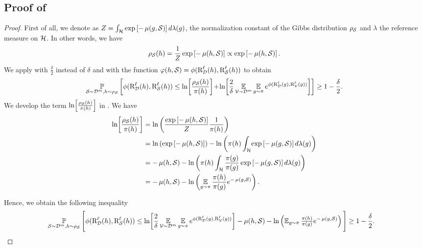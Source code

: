 \documentclass[twoside]{article}
\theoremstyle{plain}
\begin{document}
\subsection[Proof of Theorem 3]{Proof of }
\label{sec:proof-disintegrated-comp}
\theoremboundcomplexitymeasure*
\begin{proof}
First of all, we denote as $Z=\int_{\mathcal{H}}\exp\left[-\operatorname{\mu}(g, \mathcal{S})\right]d\lambda(g)$, the normalization constant of the Gibbs distribution $\rho_{\mathcal{S}}$ and $\lambda$ the reference measure on $\mathcal{H}$. 
In other words, we have
\begin{align*}
    \rho_{\mathcal{S}}(h) = \frac{1}{Z}\exp\left[-\operatorname{\mu}(h, \mathcal{S})\right] \propto \exp\left[-\operatorname{\mu}(h, \mathcal{S})\right].
\end{align*}
We apply  with $\frac{\delta}{2}$ instead of $\delta$ and with the function $\varphi(h,\mathcal{S})=\phi(\text{R}^{\ell}_{\mathcal{D}}(h), \text{R}^{\ell}_{\mathcal{S}}(h))$ to obtain
\begin{align*}
    \operatorname*{\mathbb{P}}_{\mathcal{S}\sim\mathcal{D}^m, h\sim\rho_{\mathcal{S}}}\left[\phi(\text{R}^{\ell}_{\mathcal{D}}(h), \text{R}^{\ell}_{\mathcal{S}}(h)) \le \ln\!\left[\frac{\rho_{\mathcal{S}}(h)}{\pi(h)}\right]\!+\!\ln\!\left[\frac{2}{\delta}\operatorname*{\mathbb{E}}_{\mathcal{V}\sim\mathcal{D}^m}\operatorname*{\mathbb{E}}_{g\sim\pi}e^{\phi(\text{R}^{\ell}_{\mathcal{D}}(g), \text{R}^{\ell}_{\mathcal{V}}(g))}\right] \right] \ge 1-\frac{\delta}{2}.
\end{align*}
We develop the term $\ln\!\left[\frac{\rho_{\mathcal{S}}(h)}{\pi(h)}\right]$ in . 
We have 
\begin{align*} 
    \ln\!\left[\frac{\rho_{\mathcal{S}}(h)}{\pi(h)}\right] &=  \ln\left( \frac{\exp\left[-\operatorname{\mu}(h, \mathcal{S})\right]}{Z}\frac{1}{\pi(h)}\right)\\
    &= \ln\left( \exp\left[-\operatorname{\mu}(h, \mathcal{S})\right]\right)-\ln\left(\pi(h)\int_{\mathcal{H}}\!\exp\left[-\operatorname{\mu}(g, \mathcal{S})\right] d\lambda(g)\right)\\
    &= -\operatorname{\mu}(h, \mathcal{S})-\ln\left(\pi(h)\int_{\mathcal{H}}\frac{\pi(g)}{\pi(g)}  \exp\left[-\operatorname{\mu}(g, \mathcal{S})\right]d\lambda(g) \right)\\
    &= -\operatorname{\mu}(h, \mathcal{S}) - \ln\left(\operatorname*{\mathbb{E}}_{g\sim\pi} \frac{\pi(h)}{\pi(g)}e^{-\operatorname{\mu}(g, \mathcal{S})}\right).
\end{align*}

Hence, we obtain the following inequality
\begin{align}
    &\operatorname*{\mathbb{P}}_{\mathcal{S}\sim\mathcal{D}^m,h\sim\rho_{\mathcal{S}}}\Bigg[ \phi(\text{R}^{\ell}_{\mathcal{D}}(h), \text{R}^{\ell}_{\mathcal{S}}(h)) \le \ln\!\left[\frac{2}{\delta}\operatorname*{\mathbb{E}}_{\mathcal{V}\sim\mathcal{D}^m}\operatorname*{\mathbb{E}}_{g\sim\pi}e^{\phi(\text{R}^{\ell}_{\mathcal{D}}(g), \text{R}^{\ell}_{\mathcal{V}}(g))}\right]-\operatorname{\mu}(h, \mathcal{S}) - \ln\left({\textstyle\operatorname*{\mathbb{E}}_{g\sim\pi} \frac{\pi(h)}{\pi(g)}}e^{-\operatorname{\mu}(g, \mathcal{S})}\right)\Bigg] \ge 1-\frac{\delta}{2}.\label{eq:proof-theorem-disintegrated-comp-1}
\end{align}


\end{proof}
\end{document}
